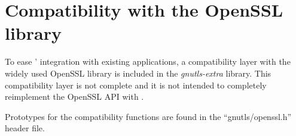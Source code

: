 \section{Compatibility with the OpenSSL library}

To ease \gnutls{}' integration with existing applications, a compatibility 
layer with the widely used OpenSSL library is included in the \emph{gnutls-extra}
library. This compatibility layer is not complete and it is not 
intended to completely reimplement the OpenSSL API with \gnutls{}.

Prototypes for the compatibility functions are found in the 
``gnutls/openssl.h'' header file.

